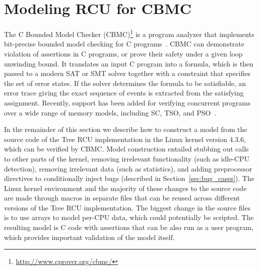 \section{Modeling RCU for CBMC} \label{sec:model_rcu}

The C Bounded Model Checker
(CBMC)\footnote{\url{http://www.cprover.org/cbmc/}} is a program analyzer
that implements bit-precise bounded model checking for C programs~\cite{KroeningTACAS04CBMC}.
CBMC can demonstrate violation of assertions in C programs, or prove their 
safety under a given loop unwinding bound.
%
It translates an input C program into a formula, which is then passed to a
modern SAT or SMT solver together with a constraint that specifies the set
of error states.  If the solver determines the formula to be satisfiable, an
error trace giving the exact sequence of events is extracted from the
satisfying assignment.
%
Recently, support has been added for verifying concurrent programs over a
wide range of memory models, including SC, TSO, and PSO~\cite{AlglaveCAV13}.

In the remainder of this section we describe how to construct a model from
the source code of the Tree RCU implementation in the Linux kernel version 4.3.6, 
which can be verified by CBMC.  Model construction entailed stubbing
out calls to other parts of the kernel, removing irrelevant functionality
(such as idle-CPU detection), removing irrelevant data (such as statistics),
and adding preprocessor directives to conditionally inject bugs (described
in Section~\ref{sec:bug_cases}). %
The Linux kernel environment and the majority of these changes to the source code 
are made through macros in separate files that can be reused across different versions 
of the Tree RCU implementation. The biggest change in the source files is to use arrays 
to model per-CPU data, which could potentially be scripted.
%
The resulting model is C code with assertions that can be also run as a
user program,
which provides important validation of the model itself.
%

